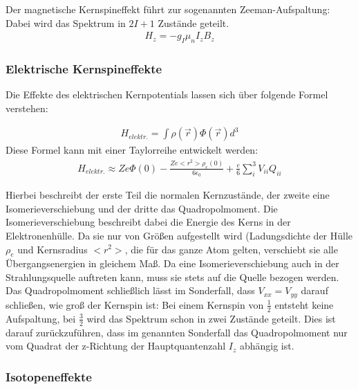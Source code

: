 \documentclass[german, %
parskip=full, %
bibliography=totoc, %
]{scrartcl}
\begin{document}
Der magnetische Kernspineffekt führt zur sogenannten Zeeman-Aufspaltung: Dabei wird das Spektrum in $2I+1$ Zustände geteilt. 
\begin{align}
H_z = -g_I \mu_n I_z B_z
\end{align}

\subsubsection{Elektrische Kernspineffekte}

Die Effekte des elektrischen Kernpotentials lassen sich über folgende Formel verstehen:

\begin{align}
H_{elektr.} = \int \rho (\vec r) \Phi (\vec r) d^3
\end{align}
Diese Formel kann mit einer Taylorreihe entwickelt werden:
\begin{align}
H_{elektr.} \approx Z e \Phi (0) - \frac{Z e < r^2 > \rho_e (0)}{6 \epsilon_0} + \frac{e}{6}\sum_i^3 V_{ii} Q_{ii}
\end{align}

Hierbei beschreibt der erste Teil die normalen Kernzustände, der zweite eine Isomerieverschiebung und der dritte das Quadropolmoment. Die Isomerieverschiebung beschreibt dabei die Energie des Kerns in der Elektronenhülle. Da sie nur von Größen aufgestellt wird (Ladungsdichte der Hülle $\rho_e$ und Kernsradius $<r^2>$, die für das ganze Atom gelten, verschiebt sie alle Übergangsenergien in gleichem Maß. Da eine Isomerieverschiebung auch in der Strahlungsquelle auftreten kann, muss sie stets auf die Quelle bezogen werden. Das Quadropolmoment schließlich lässt im Sonderfall, dass $V_{xx} = V_{yy}$ darauf schließen, wie groß der Kernspin ist: Bei einem Kernspin von $\frac{1}{2}$ entsteht keine Aufspaltung, bei $\frac{3}{2}$ wird das Spektrum schon in zwei Zustände geteilt. Dies ist darauf zurückzuführen, dass im genannten Sonderfall das Quadropolmoment nur vom Quadrat der z-Richtung der Hauptquantenzahl $I_z$ abhängig ist.

\subsubsection{Isotopeneffekte}
\end{document}

